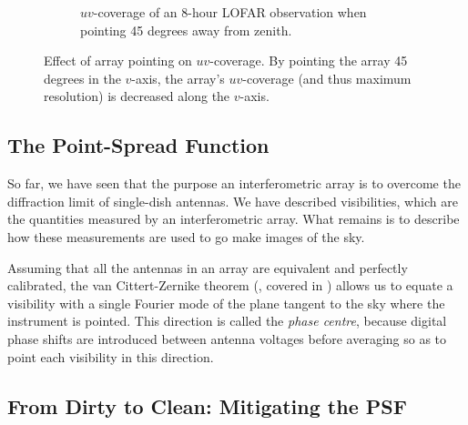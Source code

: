 \begin{figure}[h]
\begin{subfigure}{.40\textwidth}
\caption{\label{fig.lofar.uvcoverage.elsewhere} $uv$-coverage of an 8-hour LOFAR observation when pointing 45 degrees away from zenith.}
\end{subfigure}
\caption{\label{fig.uvcoverage.lofar} Effect of array pointing on $uv$-coverage. By pointing the array 45 degrees in the $v$-axis, the array's $uv$-coverage (and thus maximum resolution) is decreased along the $v$-axis.}
\end{figure}


\subsection{The Point-Spread Function}\label{sec.imag.psf}

\pg
So far, we have seen that the purpose an interferometric array is to overcome the diffraction limit of single-dish antennas. We have described visibilities, which are the quantities measured by an interferometric array. What remains is to describe how these measurements are used to go make images of the sky.

\pg
Assuming that all the antennas in an array are equivalent and perfectly calibrated, the van Cittert-Zernike theorem (, covered in ) allows us to equate a visibility with a single Fourier mode of the plane tangent to the sky where the instrument is pointed. This direction is called the \emph{phase centre}, because digital phase shifts are introduced between antenna voltages before averaging so as to point each visibility in this direction. 

\subsection{From Dirty to Clean: Mitigating the PSF}
